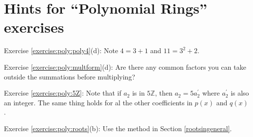 \section{Hints for ``Polynomial Rings'' exercises}\label{sec:polyrings:hints} 

\noindent Exercise \ref{exercise:poly:poly4}(d):  Note $4=3+1$ and $11=3^2+2$.

\noindent Exercise \ref{exercise:poly:multform}(d): Are there any common factors you can take outside 
the summations before multiplying?

\noindent Exercise \ref{exercise:poly:5Z}:  Note that if  $a_2$ is in $5\mathbb{Z}$, then $a_2 = 5a_2^{\prime}$ where $a_2^{\prime}$ is also an integer.
The same thing holds for al the other coefficients in $p(x)$ and $q(x)$.

\noindent Exercise \ref{exercise:poly:roots}(b):  Use the method in Section \ref{rootsingeneral}.
 
